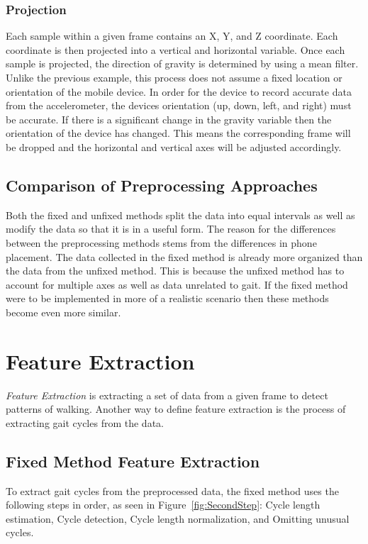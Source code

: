 \documentclass{sig-alternate}
\begin{document}
\subsubsection{Projection}{
	Each sample within a given frame contains an X, Y, and Z coordinate. Each coordinate is then projected into a vertical and horizontal variable. Once each sample is projected, the direction of gravity is determined by using a mean filter. Unlike the previous example, this process does not assume a fixed location or orientation of the mobile device. In order for the device to record accurate data from the accelerometer, the devices orientation (up, down, left, and right) must be accurate. If there is a significant change in the gravity variable then the orientation of the device has changed. This means the corresponding frame will be dropped and the horizontal and vertical axes will be adjusted accordingly. 
}
\subsection{Comparison of Preprocessing Approaches}
	Both the fixed and unfixed methods split the data into equal intervals as well as modify the data so that it is in a useful form. The reason for the differences between the preprocessing methods stems from the differences in phone placement. The data collected in the fixed method is already more organized than the data from the unfixed method. This is because the unfixed method has to account for multiple axes as well as data unrelated to gait. If the fixed method were to be implemented in more of a realistic scenario then these methods become even more similar. 

\section{Feature Extraction}
	\textit{Feature Extraction} is extracting a set of data from a given frame to detect patterns of walking. Another way to define feature extraction is the process of extracting gait cycles from the data. 		
\subsection{Fixed Method Feature Extraction}\label{FFE}
	To extract gait cycles from the preprocessed data, the fixed method uses the following steps in order, as seen in Figure~\ref{fig:SecondStep}: Cycle length estimation, Cycle detection, Cycle length normalization, and Omitting unusual cycles. 
	
\end{document}
